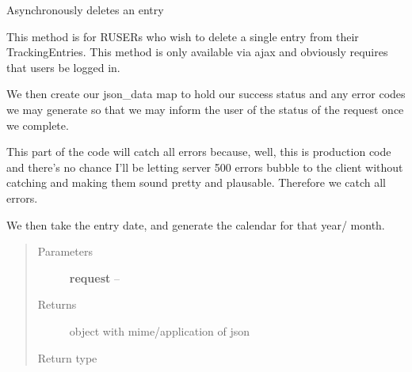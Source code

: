 \documentclass[letterpaper,10pt,english]{sphinxmanual}
\begin{document}

\begin{fulllineitems}
\label{timetracker:timetracker.utils.calendar_utils.ajax_delete_entry}
Asynchronously deletes an entry

This method is for RUSERs who wish to delete a single entry from
their TrackingEntries. This method is only available via ajax
and obviously requires that users be logged in.

We then create our json\_data map to hold our success status and any
error codes we may generate so that we may inform the user of the
status of the request once we complete.

This part of the code will catch all errors because, well, this is
production code and there's no chance I'll be letting server 500
errors bubble to the client without catching and making them
sound pretty and plausable. Therefore we catch all errors.

We then take the entry date, and generate the calendar for that year/
month.
\begin{quote}\begin{description}
\item[{Parameters}] \leavevmode
\textbf{request} -- 

\item[{Returns}] \leavevmode
{} object with mime/application of json

\item[{Return type}] \leavevmode
{}

\end{description}\end{quote}

\end{fulllineitems}

\end{document}
